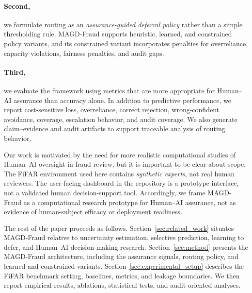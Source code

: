 \paragraph{Second,} we formulate routing as an \emph{assurance-guided deferral policy} rather than a simple thresholding rule. MAGD-Fraud supports heuristic, learned, and constrained policy variants, and its constrained variant incorporates penalties for overreliance, capacity violations, fairness penalties, and audit gaps.

\paragraph{Third,} we evaluate the framework using metrics that are more appropriate for Human--AI assurance than accuracy alone. In addition to predictive performance, we report cost-sensitive loss, overreliance, correct rejection, wrong-confident avoidance, coverage, escalation behavior, and audit coverage. We also generate claim--evidence and audit artifacts to support traceable analysis of routing behavior.

Our work is motivated by the need for more realistic computational studies of Human--AI oversight in fraud review, but it is important to be clear about scope. The FiFAR environment used here contains \emph{synthetic experts}, not real human reviewers. The user-facing dashboard in the repository is a prototype interface, not a validated human decision-support tool. Accordingly, we frame MAGD-Fraud as a computational research prototype for Human--AI assurance, not as evidence of human-subject efficacy or deployment readiness.

The rest of the paper proceeds as follows. Section~\ref{sec:related_work} situates MAGD-Fraud relative to uncertainty estimation, selective prediction, learning to defer, and Human--AI decision-making research. Section~\ref{sec:method} presents the MAGD-Fraud architecture, including the assurance signals, routing policy, and learned and constrained variants. Section~\ref{sec:experimental_setup} describes the FiFAR benchmark setting, baselines, metrics, and leakage boundaries. We then report empirical results, ablations, statistical tests, and audit-oriented analyses.
